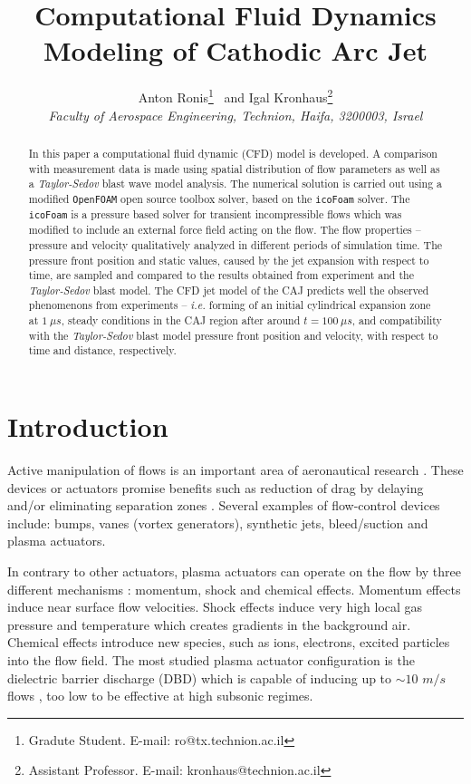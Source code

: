 \documentclass[a4paper]{iacas}%
\title{Computational Fluid Dynamics Modeling of Cathodic Arc Jet}
\author{%
	Anton Ronis\thanks{Gradute Student. E-mail: ro@tx.technion.ac.il}
	\ and
	Igal Kronhaus\thanks{Assistant Professor. E-mail: kronhaus@technion.ac.il}\\
	{\normalsize\itshape
		Faculty of Aerospace Engineering, Technion, Haifa,
		3200003, Israel}
}
\begin{document}
	
	\maketitle
	
	\begin{abstract}
		In this paper a computational fluid dynamic (CFD) model is developed. A comparison with measurement data is made using spatial distribution of flow parameters as well as a \emph{Taylor-Sedov} blast wave model analysis.
		The numerical solution is carried out using a modified \texttt{OpenFOAM} open source toolbox solver, based on the \texttt{icoFoam} solver. The \texttt{icoFoam} is a pressure based solver for transient incompressible flows which was modified to include an external force field acting on the flow.
		The flow properties -- pressure and velocity qualitatively analyzed in different periods of simulation time. The pressure front position and static values, caused by the jet expansion with respect to time, are sampled and compared to the results obtained from experiment and the \emph{Taylor-Sedov} blast model.
		The CFD jet model of the CAJ predicts well the observed phenomenons from experiments -- \emph{i.e.} forming of an initial cylindrical expansion zone at $1~\mu s$, steady conditions in the CAJ region after around $t = 100~\mu s$, and compatibility with the \emph{Taylor-Sedov} blast model pressure front position and velocity, with respect to time and distance, respectively. 
	\end{abstract}

\section{Introduction}
Active manipulation of flows is an important area of aeronautical research \cite{GADEL}. These devices or actuators promise benefits such as reduction of drag by delaying and/or eliminating separation zones \cite{SIMPSON}. Several examples of flow-control devices include: bumps, vanes (vortex generators), synthetic jets, bleed/suction and plasma actuators.

In contrary to other actuators, plasma actuators can operate on the flow by three different mechanisms \cite{FLOWCTRL}: momentum, shock and chemical effects. Momentum effects induce near surface flow velocities. Shock effects induce very high local gas pressure and temperature which creates gradients in the background air. Chemical effects introduce new species, such as ions, electrons, excited particles into the flow field. The most studied plasma actuator configuration is the dielectric barrier discharge (DBD) which is capable of inducing up to $\sim10$ $m/s$ flows \cite{FLOWCTRL,KOK,WHALLEY,MOREAU}, too low to be effective at high subsonic regimes.
\end{document}
